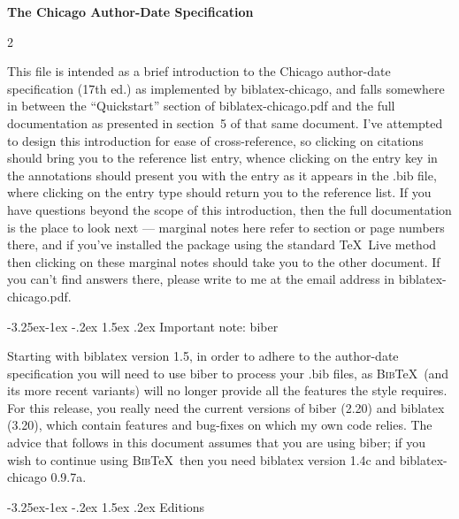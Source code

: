 \documentclass[a4paper,12pt]{article}
\makeatletter
\renewcommand{\section}{\@startsection{section}{1}{\z@}%
                                     {-3.25ex\@plus -1ex \@minus -.2ex}%
                                     {1.5ex \@plus .2ex}%
                                     {\normalfont\large\bfseries}}
\makeatother
\begin{document}
{\Large\bfseries The Chicago Author-Date Specification}
\vspace*{1.5ex}
\begin{multicols}{2}
  \renewcommand{\contentsname}{\textcolor{darkgray}{Contents}}
  \footnotesize
  \tableofcontents
\end{multicols}
This file is intended as a brief introduction to the Chicago
author-date specification (17th ed.) \autocite{chicago:manual} as
implemented by \textsf{biblatex-chicago}, and falls somewhere in
between the \enquote{Quickstart} section of
\textsf{biblatex-chicago.pdf} and the full documentation as presented
in section~5  of that same document.  I've
attempted to design this introduction for ease of cross-reference, so
clicking on citations should bring you to the reference list entry,
whence clicking on the entry key in the annotations should present you
with the entry as it appears in the .bib file, where clicking on the
entry type should return you to the reference list.  If you have
questions beyond the scope of this introduction, then the full
documentation is the place to look next --- marginal notes here refer
to section or page numbers there, and if you've installed the package
using the standard \TeX\ Live method then clicking on these marginal
notes should take you to the other document.  If you can't find
answers there, please write to me at the email address in
\textsf{biblatex-chicago.pdf}.

\section{Important note: \textsf{biber}}
\label{bibernote}

Starting with \textsf{biblatex} version 1.5, in order to adhere to the
author-date specification you will need to use \textsf{biber} to
process your .bib files, as \textsc{Bib}\TeX\ (and its more recent
variants) will no longer provide all the features the style requires.
For this release, you really need the current versions of
\textsf{biber} (2.20) and \textsf{biblatex} (3.20), which contain
features and bug-fixes on which my own code relies.  The advice that
follows in this document assumes that you are using \textsf{biber}; if
you wish to continue using \textsc{Bib}\TeX\ then you need
\textsf{biblatex} version 1.4c and \textsf{biblatex-chicago} 0.9.7a.

\section{Editions}
\label{editions}
\end{document}
